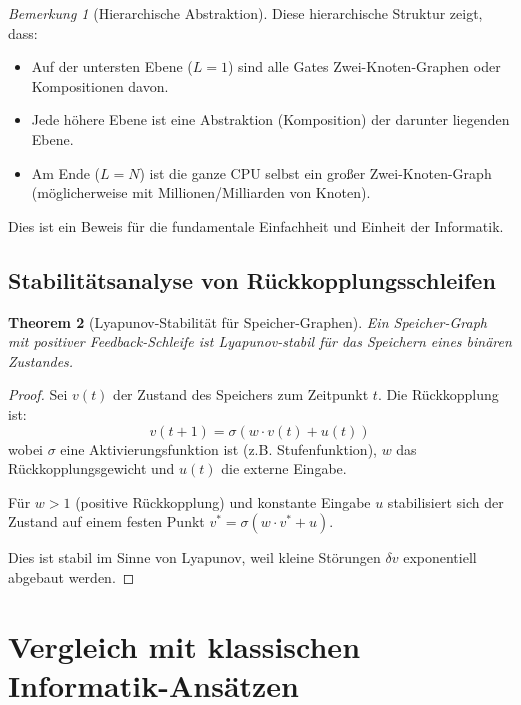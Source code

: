 \documentclass[12pt, a4paper]{article}
\newtheorem{theorem}{Theorem}[section]
\theoremstyle{definition}
\theoremstyle{remark}
\newtheorem{remark}[theorem]{Bemerkung}
\begin{document}
\begin{remark}[Hierarchische Abstraktion]
Diese hierarchische Struktur zeigt, dass:
\begin{itemize}
  \item Auf der untersten Ebene ($L=1$) sind alle Gates Zwei-Knoten-Graphen oder Kompositionen davon.
  \item Jede höhere Ebene ist eine Abstraktion (Komposition) der darunter liegenden Ebene.
  \item Am Ende ($L=N$) ist die ganze CPU selbst ein großer Zwei-Knoten-Graph (möglicherweise mit Millionen/Milliarden von Knoten).
\end{itemize}

Dies ist ein Beweis für die fundamentale Einfachheit und Einheit der Informatik.
\end{remark}

\subsection{Stabilitätsanalyse von Rückkopplungsschleifen}
\label{subsec:anhang_stabilitaet}

\begin{theorem}[Lyapunov-Stabilität für Speicher-Graphen]
\label{thm:anhang_lyapunov_speicher}
Ein Speicher-Graph mit positiver Feedback-Schleife ist Lyapunov-stabil für das Speichern eines binären Zustandes.
\end{theorem}

\begin{proof}
Sei $v(t)$ der Zustand des Speichers zum Zeitpunkt $t$. Die Rückkopplung ist:
\[
  v(t+1) = \sigma(w \cdot v(t) + u(t))
\]
wobei $\sigma$ eine Aktivierungsfunktion ist (z.B. Stufenfunktion), $w$ das Rückkopplungsgewicht und $u(t)$ die externe Eingabe.

Für $w > 1$ (positive Rückkopplung) und konstante Eingabe $u$ stabilisiert sich der Zustand auf einem festen Punkt $v^* = \sigma(w \cdot v^* + u)$.

Dies ist stabil im Sinne von Lyapunov, weil kleine Störungen $\delta v$ exponentiell abgebaut werden.
\end{proof}

\section{Vergleich mit klassischen Informatik-Ansätzen}
\label{sec:klassische_ansaetze}
\end{document}
